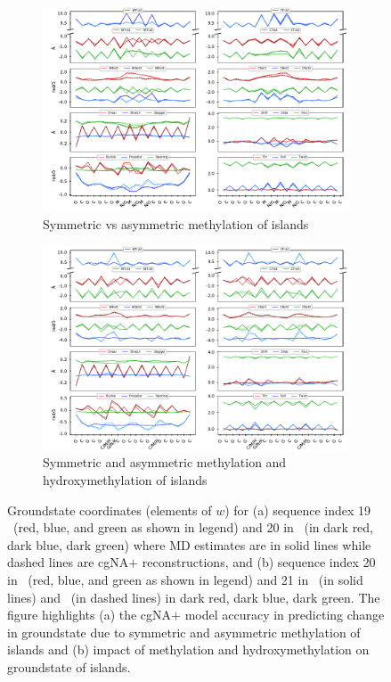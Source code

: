 \begin{figure}
  \begin{subfigure}{15cm}
    \centering\includegraphics[width=15cm]{images/cpg_islands_2.pdf}
    \centering\caption{Symmetric vs asymmetric methylation of \cpg islands}
  \end{subfigure} 

  \begin{subfigure}{15cm}
    \centering\includegraphics[width=15cm]{images/cpg_islands_1.pdf}
    \centering\caption{Symmetric and asymmetric methylation and hydroxymethylation of \cpg islands}
  \end{subfigure}
\centering\caption{Groundstate coordinates (elements of $w$) for (a) sequence index 19 \ (red, blue, and green as shown in legend) and 20 in \Lbm \ (in dark red, dark blue, dark green) where MD estimates are in solid lines while dashed lines are cgNA$+$ reconstructions, and (b) sequence index 20 in \Lbdna \ (red, blue, and green as shown in legend) and 21 in \Lbm \ (in solid lines) and \Lbh \ (in dashed lines) in dark red, dark blue, dark green. The figure highlights (a)  the cgNA$+$ model accuracy in predicting change in groundstate due to symmetric and asymmetric methylation of \cpg islands and (b) impact of methylation and hydroxymethylation on groundstate of \cpg islands.}
\label{c6:figure2}
\end{figure}

